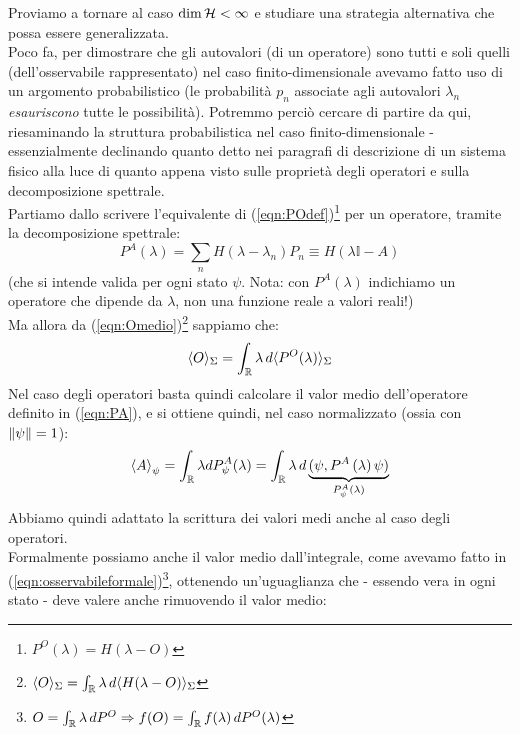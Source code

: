 \documentclass[../../FisicaTeorica.tex]{subfiles}
\begin{document}
Proviamo a tornare al caso $\operatorname{dim}\mathcal{H} < \infty$ e studiare una strategia alternativa che possa essere generalizzata.\\
Poco fa, per dimostrare che gli autovalori  (di un operatore) sono tutti e soli quelli  (dell'osservabile rappresentato) nel caso finito-dimensionale avevamo fatto uso di un argomento probabilistico (le probabilità $p_n$ associate agli autovalori $\lambda_n$ \textit{esauriscono} tutte le possibilità). Potremmo perciò cercare di partire da qui, riesaminando la struttura probabilistica nel caso finito-dimensionale - essenzialmente declinando quanto detto nei paragrafi di descrizione di un sistema fisico %
alla luce di quanto appena visto sulle proprietà degli operatori e sulla decomposizione spettrale.\\
Partiamo dallo scrivere l'equivalente di (\ref{eqn:POdef})\footnote{$P^O(\lambda) = H(\lambda-O)$} per un operatore, tramite la decomposizione spettrale: %
\begin{equation} 
P^A\left(\lambda\right)=\sum_{n}{H\left(\lambda-\lambda_n\right)P_n}\equiv H(\lambda \mathbb{I} - A) 
\label{eqn:PA}
\end{equation}
(che si intende valida per ogni stato $\psi$. Nota: con $P^A(\lambda)$ indichiamo un operatore che dipende da $\lambda$, non una funzione reale a valori reali!)\\
Ma allora da (\ref{eqn:Omedio})\footnote{$\langle O \rangle_\Sigma = \int_{\mathbb{R}} \lambda\, d\langle H(\lambda-O)\rangle_\Sigma$} sappiamo che: %
\[
\langle O \rangle_\Sigma = \int_{\mathbb{R}} \lambda\, d\langle P^O(\lambda)\rangle_\Sigma 
\]
Nel caso degli operatori basta quindi calcolare il valor medio dell'operatore definito in (\ref{eqn:PA}), e si ottiene quindi, nel caso normalizzato (ossia con $\left\lVert\psi\right\rVert = 1$):
\begin{equation}
\left\langle A\right\rangle_\psi= \int_{\mathbb{R}} \lambda dP^A_\psi(\lambda) =\int_{\mathbb{R}}{\lambda\, d \underbrace{(\psi,P^A\left(\lambda\right)\psi)}_{P_\psi^A(\lambda)}}
\label{eqn:valormedioA}
\end{equation}
Abbiamo quindi adattato la scrittura  dei valori medi anche al caso degli operatori.\\
Formalmente possiamo anche  il valor medio dall'integrale, come avevamo fatto in (\ref{eqn:osservabileformale})\footnote{$O = \int_{\mathbb{R}} \lambda\, dP^O \Rightarrow f(O) = \int_{\mathbb{R}} f(\lambda)\, dP^O(\lambda)$}, ottenendo un'uguaglianza che - essendo vera in ogni stato - deve valere anche rimuovendo il valor medio: %
\end{document}
